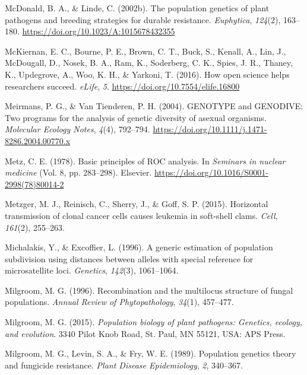 \documentclass[double,11pt]{beavtex}
\begin{document}
  \hypertarget{ref-Mcdonald2002}{}
  McDonald, B. A., \& Linde, C. (2002b). The population genetics of plant
  pathogens and breeding strategies for durable resistance.
  \emph{Euphytica}, \emph{124}(2), 163--180.
  \url{https://doi.org/10.1023/A:1015678432355}
  
  \hypertarget{ref-mckiernan2016open}{}
  McKiernan, E. C., Bourne, P. E., Brown, C. T., Buck, S., Kenall, A.,
  Lin, J., McDougall, D., Nosek, B. A., Ram, K., Soderberg, C. K., Spies,
  J. R., Thaney, K., Updegrove, A., Woo, K. H., \& Yarkoni, T. (2016). How
  open science helps researchers succeed. \emph{eLife}, \emph{5}.
  \url{https://doi.org/10.7554/elife.16800}
  
  \hypertarget{ref-meirmans2004genotype}{}
  Meirmans, P. G., \& Van Tienderen, P. H. (2004). GENOTYPE and GENODIVE:
  Two programs for the analysis of genetic diversity of asexual organisms.
  \emph{Molecular Ecology Notes}, \emph{4}(4), 792--794.
  \url{https://doi.org/10.1111/j.1471-8286.2004.00770.x}
  
  \hypertarget{ref-metz1978basic}{}
  Metz, C. E. (1978). Basic principles of ROC analysis. In \emph{Seminars
  in nuclear medicine} (Vol. 8, pp. 283--298). Elsevier.
  \url{https://doi.org/10.1016/S0001-2998(78)80014-2}
  
  \hypertarget{ref-metzger2015horizontal}{}
  Metzger, M. J., Reinisch, C., Sherry, J., \& Goff, S. P. (2015).
  Horizontal transmission of clonal cancer cells causes leukemia in
  soft-shell clams. \emph{Cell}, \emph{161}(2), 255--263.
  
  \hypertarget{ref-michalakis1996generic}{}
  Michalakis, Y., \& Excoffier, L. (1996). A generic estimation of
  population subdivision using distances between alleles with special
  reference for microsatellite loci. \emph{Genetics}, \emph{142}(3),
  1061--1064.
  
  \hypertarget{ref-milgroom1996recombination}{}
  Milgroom, M. G. (1996). Recombination and the multilocus structure of
  fungal populations. \emph{Annual Review of Phytopathology},
  \emph{34}(1), 457--477.
  
  \hypertarget{ref-milgroom2015population}{}
  Milgroom, M. G. (2015). \emph{Population biology of plant pathogens:
  Genetics, ecology, and evolution}. 3340 Pilot Knob Road, St. Paul, MN
  55121, USA: APS Press.
  
  \hypertarget{ref-milgroom1989population}{}
  Milgroom, M. G., Levin, S. A., \& Fry, W. E. (1989). Population genetics
  theory and fungicide resistance. \emph{Plant Disease Epidemiology},
  \emph{2}, 340--367.
  
\end{document}
